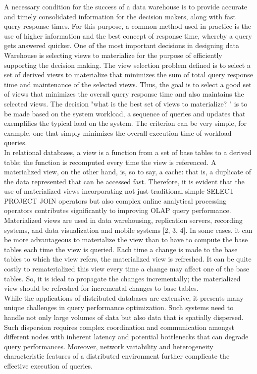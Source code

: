 A necessary condition for the success of a data warehouse is to provide accurate and timely consolidated information for the decision makers, along with fast query response times. For this purpose, a common method used in practice is the use of higher information and the best concept of response time, whereby a query gets answered quicker. One of the most important decisions in designing data Warehouse is selecting views to materialize for the purpose of efficiently supporting the decision making. The view selection problem defined is to select a set of derived views to materialize that minimizes the sum of total query response time  and  maintenance of the selected views. Thus, the goal is to select a good set of views that minimizes the overall query response time and also maintains the selected views. The decision "what is the best set of views to materialize? " is to be made based on the system workload, a sequence of queries and updates that exemplifies the typical load on the system. The criterion can be very simple, for example, one that simply minimizes the overall execution time of workload queries.\\
In relational databases, a view is a function from a set of base tables to a derived table; the function is recomputed every time the view is referenced. A materialized view, on the other hand, is, so to say, a cache: that is, a duplicate of the data represented that can be accessed fast. Therefore, it is evident that the use of materialized views incorporating not just traditional simple SELECT PROJECT JOIN operators but also complex online analytical processing operators contributes significantly to improving OLAP query performance. Materialized views are used in data warehousing, replication servers, recording systems, and data visualization and mobile systems [2, 3, 4]. In some cases, it can be more advantageous to materialize the view than to have to compute the base tables each time the view is queried. Each time a change is made to the base tables to which the view refers, the materialized view is refreshed. It can be quite costly to rematerialized this view every time a change may affect one of the base tables. So, it is ideal to propagate the changes incrementally; the materialized view should be refreshed for incremental changes to base tables.\cite{Data_warehousing,efficient_incremental,rashid2009role}\\
While the applications of distributed databases are extensive, it presents many unique challenges in query performance optimization. Such systems need to handle not only large volumes of data but also data that is spatially dispersed. Such dispersion requires complex coordination and communication amongst different nodes with inherent latency and potential bottlenecks that can degrade query performances. Moreover, network variability and heterogeneity characteristic features of a distributed environment further complicate the effective execution of queries.

